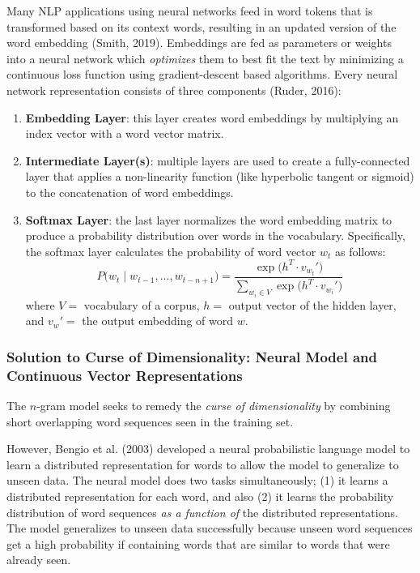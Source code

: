Many NLP applications using neural networks feed in word tokens that is transformed based on its context words, resulting in an updated version of the word embedding (Smith, 2019). Embeddings are fed as parameters or weights into a neural network which \emph{optimizes} them to best fit the text by minimizing a continuous loss function using gradient-descent based algorithms. Every neural network representation consists of three components (Ruder, 2016):

\begin{enumerate}
    \item \textbf{Embedding Layer}: this layer creates word embeddings by multiplying an index vector with a word vector matrix. 
    
    \item \textbf{Intermediate Layer(s)}: multiple layers are used to create a fully-connected layer that applies a non-linearity function (like hyperbolic tangent or sigmoid) to the concatenation of word embeddings. 
    
    \item \textbf{Softmax Layer}: the last layer normalizes the word embedding matrix to produce a probability distribution over words in the vocabulary. Specifically, the softmax layer calculates the probability of word vector $w_t$ as follows: 
    $$
    P \Big(w_t \; | \; w_{t-1}, ..., w_{t-n+1} \Big) = \frac {\exp{ \Big(h^T \cdot v_{w_t}' \Big) }} {\sum_{w_i \in V} \exp{ \Big(h^T \cdot v_{w_i}' \Big) }}
    $$
    where $V = $ vocabulary of a corpus, $h = $ output vector of the hidden layer, and $v_w' = $ the output embedding of word $w$. 
\end{enumerate}


\subsubsection{Solution to Curse of Dimensionality: Neural Model and Continuous Vector Representations}

The $n$-gram model seeks to remedy the \emph{curse of dimensionality} by combining short overlapping word sequences seen in the training set. 

However, Bengio et al. (2003) developed a neural probabilistic language model to learn a distributed representation for words to allow the model to generalize to unseen data. The neural model does two tasks simultaneously; (1) it learns a distributed representation for each word, and also (2) it learns the probability distribution of word sequences \emph{as a function of} the distributed representations. The model generalizes to unseen data successfully because unseen word sequences get a high probability if containing words that are similar to words that were already seen.  

